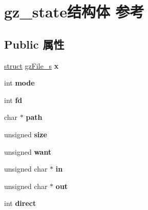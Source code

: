 \hypertarget{structgz__state}{}\section{gz\+\_\+state结构体 参考}
\label{structgz__state}
\subsection*{Public 属性}
\begin{DoxyCompactItemize}
\item 
\mbox{\label{structgz__state_a92b9a7b77e0b6a494275d8bf0f0f3274}} 
\hyperlink{interfacestruct}{struct} \hyperlink{structgz_file__s}{gz\+File\+\_\+s} {\bfseries x}
\item 
\mbox{\label{structgz__state_aaded3d8b2702b1bfabe3141e6f772b1a}} 
int {\bfseries mode}
\item 
\mbox{\label{structgz__state_a5963abca9e640ff2aa40b517f9cffc2c}} 
int {\bfseries fd}
\item 
\mbox{\label{structgz__state_ad52b106362f7262800d7224ff90fdd16}} 
char $\ast$ {\bfseries path}
\item 
\mbox{\label{structgz__state_a36b86ed64aca8f022ec0f3411663fe24}} 
unsigned {\bfseries size}
\item 
\mbox{\label{structgz__state_abee992fb115f9f118377b9f46d14b2a5}} 
unsigned {\bfseries want}
\item 
\mbox{\label{structgz__state_af16c5730c48518809ead34557d612942}} 
unsigned char $\ast$ {\bfseries in}
\item 
\mbox{\label{structgz__state_ad83d10502587255806fd712109867106}} 
unsigned char $\ast$ {\bfseries out}
\item 
\mbox{\label{structgz__state_a114c6a0de43039853ead48a092792a7d}} 
int {\bfseries direct}
\item 
\mbox{\label{structgz__state_ac6e4b7db699aacd089f6d55b01483d6f}} 

\end{DoxyCompactItemize}
